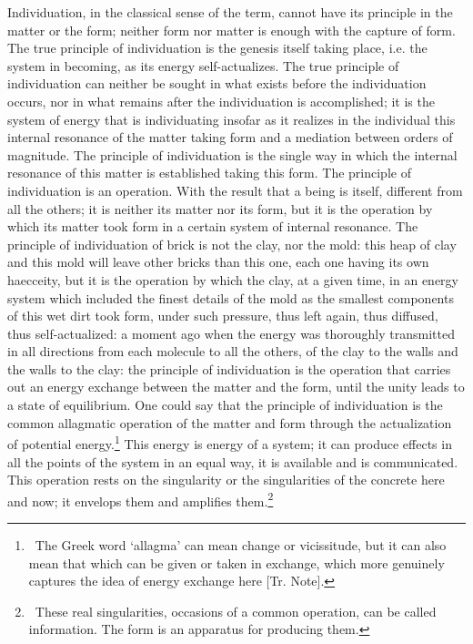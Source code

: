 \documentclass[a4paper]{article}
\begin{document}
Individuation, in the classical sense of the term, cannot have its principle in the matter or the form; neither form nor matter is enough with the capture of form. The true principle of individuation is the genesis itself taking place, i.e. the system in becoming, as its energy self-actualizes. The true principle of individuation can neither be sought in what exists before the individuation occurs, nor in what remains after the individuation is accomplished; it is the system of energy that is individuating insofar as it realizes in the individual this internal resonance of the matter taking form and a mediation between orders of magnitude. The principle of individuation is the single way in which the internal resonance of this matter is established taking this form. The principle of individuation is an operation. With the result that a being is itself, different from all the others; it is neither its matter nor its form, but it is the operation by which its matter took form in a certain system of internal resonance. The principle of individuation of brick is not the clay, nor the mold: this heap of clay and this mold will leave other bricks than this one, each one having its own haecceity, but it is the operation by which the clay, at a given time, in an energy system which included the finest details of the mold as the smallest components of this wet dirt took form, under such pressure, thus left again, thus diffused, thus self-actualized: a moment ago when the energy was thoroughly transmitted in all directions from each molecule to all the others, of the clay to the walls and the walls to the clay: the principle of individuation is the operation that carries out an energy exchange between the matter and the form, until the unity leads to a state of equilibrium. One could say that the principle of individuation is the common allagmatic operation of the matter and form through the actualization of potential energy.\footnote{\ The Greek word \lq{}allagma\rq{} can mean change or vicissitude, but it can also mean that which can be given or taken in exchange, which more genuinely captures the idea of energy exchange here [Tr. Note].} This energy is energy of a system; it can produce effects in all the points of the system in an equal way, it is available and is communicated. This operation rests on the singularity or the singularities of the concrete here and now; it envelops them and amplifies them.\footnote{\ These real singularities, occasions of a common operation, can be called information. The form is an apparatus for producing them.}
\end{document}
